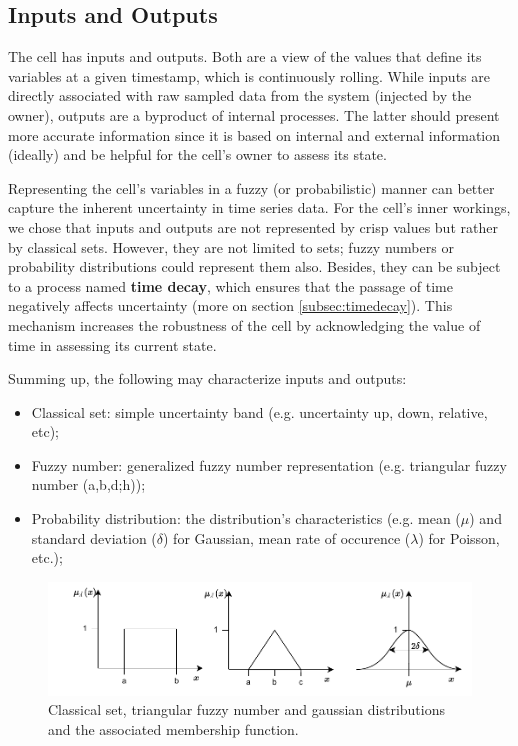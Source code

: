 
\subsection{Inputs and Outputs}

The cell has inputs and outputs. Both are a view of the values that define its variables at a given timestamp, which is continuously rolling. While inputs are directly associated with raw sampled data from the system (injected by the owner), outputs are a byproduct of internal processes. The latter should present more accurate information since it is based on internal and external information (ideally) and be helpful for the cell's owner to assess its state.

Representing the cell's variables in a fuzzy (or probabilistic) manner can better capture the inherent uncertainty in time series data. For the cell's inner workings, we chose that inputs and outputs are not represented by crisp values but rather by classical sets. However, they are not limited to sets; fuzzy numbers or probability distributions could represent them also. Besides, they can be subject to a process named \textbf{time decay}, which ensures that the passage of time negatively affects uncertainty (more on section \ref{subsec:timedecay}). This mechanism increases the robustness of the cell by acknowledging the value of time in assessing its current state.

Summing up, the following may characterize inputs and outputs:

\begin{itemize}
    \item Classical set: simple uncertainty band (e.g. uncertainty up, down, relative, etc);
    \item Fuzzy number: generalized fuzzy number representation \cite{Zhang2019} (e.g. triangular fuzzy number (a,b,d;h));
    \item Probability distribution: the distribution's characteristics (e.g. mean ($\mu$) and standard deviation ($\delta$) for Gaussian, mean rate of occurence ($\lambda$) for Poisson, etc.);
\end{itemize}

\begin{figure}[h!]
    \centering
    \includegraphics[width=15cm]{figures/chapter4/cell/classic_fuzzy_gaussian.pdf}
    \caption{Classical set, triangular fuzzy number and gaussian distributions and the associated membership function.}
    \label{fig:classicfuzzygaussian}
\end{figure}

